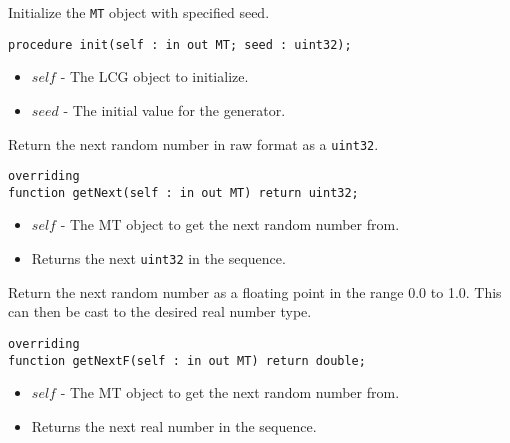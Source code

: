 \documentclass[10pt, openany]{book}
\newcommand{\datatype}[1]{\texttt{#1}}
\begin{document}
Initialize the \datatype{MT} object with specified seed.
\begin{lstlisting}
procedure init(self : in out MT; seed : uint32);
\end{lstlisting}
\begin{itemize}
  \item $self$ - The LCG object to initialize.
  \item $seed$ - The initial value for the generator.
\end{itemize}

Return the next random number in raw format as a \datatype{uint32}.
\begin{lstlisting}
overriding
function getNext(self : in out MT) return uint32;
\end{lstlisting}
\begin{itemize}
  \item $self$ - The MT object to get the next random number from.
  \item Returns the next \datatype{uint32} in the sequence.
\end{itemize}

Return the next random number as a floating point in the range 0.0 to 1.0.  This can then be cast to the desired real number type.
\begin{lstlisting}
overriding
function getNextF(self : in out MT) return double;
\end{lstlisting}
\begin{itemize}
  \item $self$ - The MT object to get the next random number from.
  \item Returns the next real number in the sequence.
\end{itemize}

\end{document}

